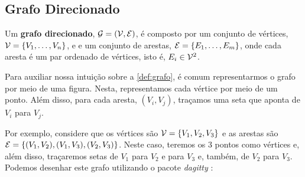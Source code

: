 \subsection{Grafo Direcionado}

\begin{definition}
 \label{def:grafo}
 Um \textbf{grafo direcionado}, 
 ${\mathcal G} = ({\mathcal V}, {\mathcal E})$,
 é composto por um conjunto de vértices,
 ${\mathcal V} = \{V_1, \ldots, V_n\}$, e
 e um conjunto de arestas,
 ${\mathcal E} = \{E_1, \ldots, E_m\}$, onde
 cada aresta é um par ordenado de vértices, isto é,
 $E_i \in {\mathcal V}^2$.
\end{definition}

Para auxiliar nossa intuição sobre a
\cref{def:grafo}, é comum representarmos
o grafo por meio de uma figura.
Nesta, representamos cada vértice por meio de um ponto.
Além disso, para cada aresta, $(V_i, V_j)$,
traçamos uma seta que aponta de $V_i$ para $V_j$.

Por exemplo, considere que os vértices são
${\mathcal V} = \{V_1, V_2, V_3\}$ e as arestas são
${\mathcal E} = \{(V_1, V_2), (V_1, V_3), (V_2, V_3)\}$.
Neste caso, teremos os $3$ pontos como vértices e,
além disso, traçaremos setas de $V_1$ para $V_2$ e para $V_3$ e,
também, de $V_2$ para $V_3$.
Podemos desenhar este grafo utilizando o
pacote \textit{dagitty} \citep{Textor2016}:

